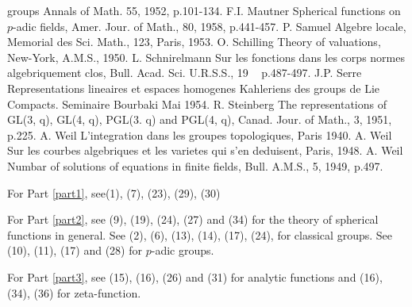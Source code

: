 \begin{thebibliography}{99}
  groups Annals of Math. 55, 1952, p.101-134. 
 {F.I. Mautner} Spherical functions on $p$-adic fields,
  Amer. Jour. of Math., 80, 1958, p.441-457. 
 {P. Samuel} Algebre locale, Memorial des Sci. Math.,
  123, Paris, 1953. 
 {O. Schilling} Theory of valuations, New-York, A.M.S.,
  1950. 
 {L. Schnirelmann} Sur les fonctions dans les corps
  normes algebriquement clos, Bull. Acad. Sci. U.R.S.S., 19 ~
  p.487-497. 
 {J.P. Serre} Representations lineaires et espaces
  homogenes Kahleriens des groups de Lie Compacts. Seminaire Bourbaki
  Mai 1954. 
 {R. Steinberg} The representations of GL(3, q), GL(4,
  q), PGL(3. q) and PGL(4, q), Canad. Jour. of Math., 3, 1951,
  p.225. 
 {A. Weil} L'integration dans les groupes topologiques,
  Paris 1940. 
 {A. Weil} Sur les courbes algebriques et les varietes
  qui s'en deduisent, Paris, 1948. 
 {A. Weil} Numbar of solutions of equations in finite
  fields, Bull. A.M.S., 5, 1949, p.497. 
 
  {For Part \ref{part1}}, see\pageoriginale (1), (7), (23), (29), (30)

  {For Part \ref{part2}}, see (9), (19), (24), (27) and (34) for
  the theory of spherical functions in general. See (2), (6), (13),
  (14), (17), (24), for classical groups. See (10), (11), (17) and
  (28) for $p$-adic groups. 

  {For Part \ref{part3}}, see (15), (16), (26) and (31) for
  analytic functions and (16), (34), (36) for zeta-function. 
\end{thebibliography}
